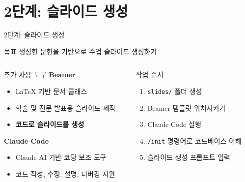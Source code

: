 \documentclass[aspectratio=169,xcolor=dvipsnames]{beamer}
\begin{document}
\section{2단계: 슬라이드 생성}

\begin{frame}{2단계: 슬라이드 생성}
  \begin{block}{목표}
    생성한 문헌을 기반으로 수업 슬라이드 생성하기
  \end{block}


  \begin{columns}[t]
    \begin{column}{0.48\textwidth}
      \begin{exampleblock}{추가 사용 도구}
        \textbf{Beamer}
        \begin{itemize}
          \item LaTeX 기반 문서 클래스
          \item 학술 및 전문 발표용 슬라이드 제작
          \item \textbf{코드로 슬라이드를 생성}
        \end{itemize}

        \vspace{0.3cm}

        \textbf{Claude Code}
        \begin{itemize}
          \item Claude AI 기반 코딩 보조 도구
          \item 코드 작성, 수정, 설명, 디버깅 지원
        \end{itemize}
      \end{exampleblock}
    \end{column}

    \begin{column}{0.48\textwidth}
      \begin{alertblock}{작업 순서}
        \begin{enumerate}
          \item \texttt{slides/} 폴더 생성
          \item Beamer 템플릿 위치시키기
          \item Claude Code 실행
          \item \texttt{/init} 명령어로 코드베이스 이해
          \item 슬라이드 생성 프롬프트 입력
        \end{enumerate}
      \end{alertblock}
    \end{column}
  \end{columns}
\end{frame}
\end{document}
